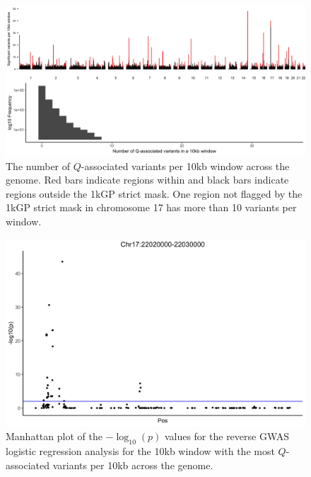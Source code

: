 \documentclass[9pt,lineno]{template}
\begin{document}
\begin{figure}[h]
\centering
\includegraphics[width=15cm,keepaspectratio]{../Figures/VariantDensity.jpg}
\caption{The number of $Q$-associated variants per 10kb window across the genome.
Red bars indicate regions within and black bars indicate regions outside the 1kGP strict mask.
One region not flagged by the 1kGP strict mask in chromosome 17 has more than 10 variants per window.}  
\label{VariantDensity}
\end{figure}

\begin{figure}[h]
\centering
\includegraphics[width=15cm,keepaspectratio]{../Figures/RegionOver10.jpg}
\caption{Manhattan plot of the $-\log_{10}(p)$ values for the reverse GWAS logistic regression analysis for the 10kb window with the most  $Q$-associated variants per 10kb across the genome.}  
\label{Top10}
\end{figure}
\end{document}

